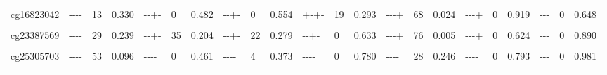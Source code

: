 \documentclass[11pt,twoside]{bristolthesis}
\begin{document}
\begin{landscape}
\begin{table}[!h]
{\begin{tabular}[t]{llllllllllllllllllllll}
cg16823042 & {-}{-}{-}{-} & 13 & 0.330 & {-}{-}{+}{-} & 0 & 0.482 & {-}{-}{+}{-} & 0 & 0.554 & {+}{-}{+}{-} & 19 & 0.293 & {-}{-}{-}{+} & 68 & 0.024 & {-}{-}{-}{+} & 0 & 0.919 & {-}{-}{-} & 0 & 0.648\\
\addlinespace
\cellcolor{gray!6}{cg21566642} & \cellcolor{gray!6}{{-}{-}{-}{-}} & \cellcolor{gray!6}{46} & \cellcolor{gray!6}{0.136} & \cellcolor{gray!6}{{-}{-}{-}{-}} & \cellcolor{gray!6}{38} & \cellcolor{gray!6}{0.184} & \cellcolor{gray!6}{{-}{-}{-}{-}} & \cellcolor{gray!6}{18} & \cellcolor{gray!6}{0.300} & \cellcolor{gray!6}{{+}{-}{+}{+}} & \cellcolor{gray!6}{0} & \cellcolor{gray!6}{0.681} & \cellcolor{gray!6}{{-}{-}{-}{-}} & \cellcolor{gray!6}{0} & \cellcolor{gray!6}{0.798} & \cellcolor{gray!6}{{-}{-}{-}{-}} & \cellcolor{gray!6}{65} & \cellcolor{gray!6}{0.035} & \cellcolor{gray!6}{{-}{-}{-}} & \cellcolor{gray!6}{69} & \cellcolor{gray!6}{0.040}\\
cg23387569 & {-}{-}{-}{-} & 29 & 0.239 & {-}{-}{+}{-} & 35 & 0.204 & {-}{-}{+}{-} & 22 & 0.279 & {-}{-}{+}{-} & 0 & 0.633 & {-}{-}{-}{+} & 76 & 0.005 & {-}{-}{-}{+} & 0 & 0.624 & {-}{-}{-} & 0 & 0.890\\
\cellcolor{gray!6}{cg23771366} & \cellcolor{gray!6}{{-}{-}{-}{-}} & \cellcolor{gray!6}{42} & \cellcolor{gray!6}{0.161} & \cellcolor{gray!6}{{-}{-}{-}{-}} & \cellcolor{gray!6}{75} & \cellcolor{gray!6}{0.007} & \cellcolor{gray!6}{{-}{-}{-}{-}} & \cellcolor{gray!6}{72} & \cellcolor{gray!6}{0.013} & \cellcolor{gray!6}{{+}{+}{+}{+}} & \cellcolor{gray!6}{0} & \cellcolor{gray!6}{0.805} & \cellcolor{gray!6}{{-}{-}{-}{-}} & \cellcolor{gray!6}{0} & \cellcolor{gray!6}{0.518} & \cellcolor{gray!6}{{-}{-}{-}{+}} & \cellcolor{gray!6}{27} & \cellcolor{gray!6}{0.249} & \cellcolor{gray!6}{{+}{-}{-}} & \cellcolor{gray!6}{81} & \cellcolor{gray!6}{0.006}\\
cg25305703 & {-}{-}{-}{-} & 53 & 0.096 & {-}{-}{-}{-} & 0 & 0.461 & {-}{-}{-}{-} & 4 & 0.373 & {-}{-}{-}{-} & 0 & 0.780 & {-}{-}{-}{-} & 28 & 0.246 & {-}{-}{-}{-} & 0 & 0.793 & {-}{-}{-} & 0 & 0.981\\
\cellcolor{gray!6}{cg26963277} & \cellcolor{gray!6}{{-}{-}{-}{-}} & \cellcolor{gray!6}{0} & \cellcolor{gray!6}{0.512} & \cellcolor{gray!6}{{-}{-}{-}{-}} & \cellcolor{gray!6}{0} & \cellcolor{gray!6}{0.516} & \cellcolor{gray!6}{{-}{-}{-}{-}} & \cellcolor{gray!6}{0} & \cellcolor{gray!6}{0.430} & \cellcolor{gray!6}{{-}{-}{+}{+}} & \cellcolor{gray!6}{53} & \cellcolor{gray!6}{0.095} & \cellcolor{gray!6}{{-}{-}{-}{+}} & \cellcolor{gray!6}{0} & \cellcolor{gray!6}{0.466} & \cellcolor{gray!6}{{-}{-}{-}{-}} & \cellcolor{gray!6}{17} & \cellcolor{gray!6}{0.308} & \cellcolor{gray!6}{{-}{-}{-}} & \cellcolor{gray!6}{10} & \cellcolor{gray!6}{0.329}\\

\end{tabular}}
\end{table}
\end{landscape}
\end{document}
